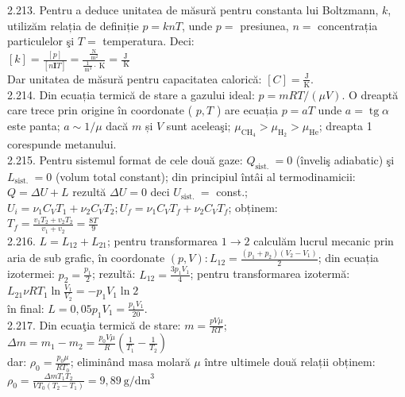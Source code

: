 2.213. Pentru a deduce unitatea de măsură pentru constanta lui Boltzmann, $k$, utilizăm relația de definiție $p=k n T$, unde $p=$ presiunea, $n=$ concentrația particulelor şi $T=$ temperatura. Deci:\\ $[k]=\frac{[p]}{[n \mathbf{I} T]}=\frac{\frac{\mathrm{N}}{\mathrm{~m}^{2}}}{\frac{1}{\mathrm{~m}^{3}} \cdot \mathrm{~K}}=\frac{\mathrm{J}}{\mathrm{~K}}$\\ Dar unitatea de măsură pentru capacitatea calorică: $[C]=\frac{\mathrm{J}}{\mathrm{K}}$.\\

2.214. Din ecuația termică de stare a gazului ideal: $p=m R T /(\mu V)$. O dreaptă care trece prin origine în coordonate ( $p, T$ ) are ecuația $p=a T$ unde $a=\operatorname{tg} \alpha$ este panta; $a \sim 1 / \mu$ dacă $m$ și $V$ sunt aceleaşi; $\mu_{\mathrm{CH}_{4}}>\mu_{\mathrm{H}_{2}}>\mu_{\mathrm{He}}$; dreapta 1 corespunde metanului.\\

2.215. Pentru sistemul format de cele două gaze: $Q_{\text {sist. }}=0$ (înveliş adiabatic) şi $L_{\text {sist. }}=0$ (volum total constant); din principiul întâi al termodinamicii: $Q=\Delta U+L$ rezultă $\Delta U=0$ deci $U_{\text {sist. }}=$ const.; $U_{i}=\nu_{1} C_{V} T_{1}+\nu_{2} C_{V} T_{2} ; U_{f}=\nu_{1} C_{V} T_{f}+\nu_{2} C_{V} T_{f}$; obținem:\\ $T_{f}=\frac{v_{1} T_{2}+v_{2} T_{2}}{v_{1}+v_{2}}=\frac{8 T}{9}$\\

2.216. $L=L_{12}+L_{21}$; pentru transformarea $1 \rightarrow 2$ calculăm lucrul mecanic prin aria de sub grafic, în coordonate $(p, V): L_{12}=\frac{\left(p_{1}+p_{2}\right)\left(V_{2}-V_{1}\right)}{2}$; din ecuația izotermei: $p_{2}=\frac{p_{1}}{2}$; rezultă: $L_{12}=\frac{3 p_{1} V_{1}}{4}$; pentru transformarea izotermă:\\ $L_{21} \nu R T_{1} \ln \frac{V_{1}}{V_{2}}=-p_{1} V_{1} \ln 2$\\ în final: $L=0,05 p_{1} V_{1}=\frac{p_{1} V_{1}}{20}$.\\

2.217. Din ecuaţia termică de stare: $m=\frac{p V \mu}{R T}$;\\ $\Delta m=m_{1}-m_{2}=\frac{p_{0} V \mu}{R}\left(\frac{1}{T_{1}}-\frac{1}{T_{2}}\right)$\\ dar: $\rho_{0}=\frac{p_{0} \mu}{R T_{0}}$; eliminând masa molară $\mu$ între ultimele două relații obținem:\\ $\rho_{0}=\frac{\Delta m T_{1} T_{2}}{V T_{0}\left(T_{2}-T_{1}\right)}=9,89 \mathrm{~g} / \mathrm{dm}^{3}$\\

